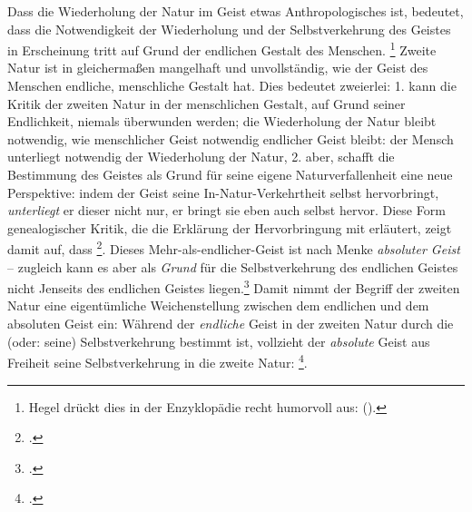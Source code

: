 \documentclass[12pt, a4paper, openany]{report}
\begin{document}
Dass die Wiederholung der Natur im Geist etwas Anthropologisches ist, bedeutet, dass die Notwendigkeit der Wiederholung und der Selbstverkehrung des Geistes in Erscheinung tritt auf Grund der endlichen Gestalt des Menschen.%
\footnote{
    Hegel drückt dies in der Enzyklopädie recht humorvoll aus:  (\cite[][§ 410 (Anmerkung), S. 186]{hegel_enzyklopädie_1969}).
}
Zweite Natur ist in gleichermaßen mangelhaft und unvollständig, wie der Geist des Menschen endliche, menschliche Gestalt hat.
Dies bedeutet zweierlei: 
1. kann die Kritik der zweiten Natur in der menschlichen Gestalt, auf Grund seiner Endlichkeit, niemals überwunden werden; 
die Wiederholung der Natur bleibt notwendig, wie menschlicher Geist notwendig endlicher Geist bleibt:
der Mensch unterliegt notwendig der Wiederholung der Natur,
2. aber, schafft die Bestimmung des Geistes als Grund für seine eigene Naturverfallenheit eine neue Perspektive: 
indem der Geist seine In-Natur-Verkehrtheit selbst hervorbringt, \emph{unterliegt} er dieser nicht nur, er bringt sie eben auch selbst hervor.
Diese Form genealogischer Kritik, die die Erklärung der Hervorbringung mit erläutert, zeigt damit auf, dass \footcite[][140]{menke_autonomie_2018}.
Dieses Mehr-als-endlicher-Geist ist nach Menke \emph{absoluter Geist} -- zugleich kann es aber als \emph{Grund} für die Selbstverkehrung des endlichen Geistes nicht Jenseits des endlichen Geistes liegen.\footcite[Vgl.][140]{menke_autonomie_2018}
Damit nimmt der Begriff der zweiten Natur eine eigentümliche Weichenstellung zwischen dem endlichen und dem absoluten Geist ein:
Während der \emph{endliche} Geist in der zweiten Natur durch die (oder: seine) Selbstverkehrung bestimmt ist, vollzieht der \emph{absolute} Geist aus Freiheit seine Selbstverkehrung in die zweite Natur:
\footcite[Vgl.][140]{menke_autonomie_2018}.\\
\end{document}
